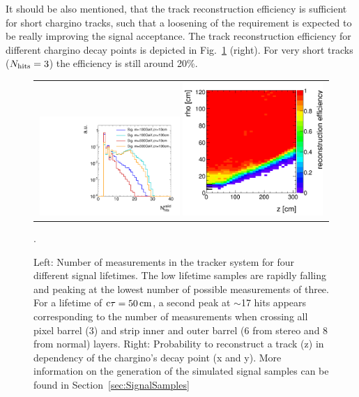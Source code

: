 It should be also mentioned, that the track reconstruction efficiency is sufficient for short chargino tracks, such that a loosening of the \nhits requirement is expected to be really improving the signal acceptance.
The track reconstruction efficiency for different chargino decay points is depicted in Fig.~\ref{fig:NHits_2Signal_noSelection_normalized} (right).
For very short tracks ($N_{\text{hits}}=3$) the efficiency is still around 20\%.\\
\begin{figure}[!bt]
  \centering 
  \begin{tabular}{c}
  \includegraphics[width=0.49\textwidth]{figures/analysis/MotivationAndGeneralSearchStrategy/htrackNValid_log_chiTracksnoSelection.pdf}
  \includegraphics[width=0.49\textwidth]{figures/analysis/MotivationAndGeneralSearchStrategy/RecoEffTracksZoom.png}
  \end{tabular}
  \caption{Left: Number of measurements in the tracker system \nhits for four different signal lifetimes.
                 The low lifetime samples are rapidly falling and peaking at the lowest number of possible measurements of three. 
                 For a lifetime of $\text{c}\tau=50\,\text{cm}$, a second peak at $\sim$17 hits appears corresponding to the number of measurements when crossing all pixel barrel (3) and strip inner and outer barrel (6 from stereo and 8 from normal) layers.
           Right: Probability to reconstruct a track (z) in dependency of the chargino's decay point (x and y).
           More information on the generation of the simulated signal samples can be found in Section~\ref{sec:SignalSamples}}. 
  \label{fig:NHits_2Signal_noSelection_normalized}
\end{figure}



